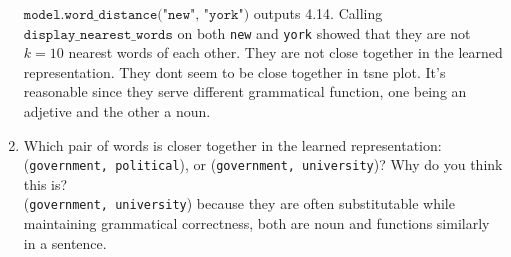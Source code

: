 \documentclass[11pt]{article}
\begin{document}
\begin{enumerate}
    $\texttt{model.word\_distance("new", "york")}$ outputs 4.14. Calling $\texttt{display\_nearest\_words}$ on both \texttt{new} and \texttt{york} showed that they are not $k=10$ nearest words of each other. They are not close together in the learned representation. They dont seem to be close together in tsne plot. It's reasonable since they serve different grammatical function, one being an adjetive and the other a noun. 
    \item Which pair of words is closer together in the learned representation: (\texttt{government, political}), or (\texttt{government, university})? Why do you think this is? \\ 
    (\texttt{government, university}) because they are often substitutable while maintaining grammatical correctness, both are noun and functions similarly in a sentence.
\end{enumerate}



 
\end{document}
